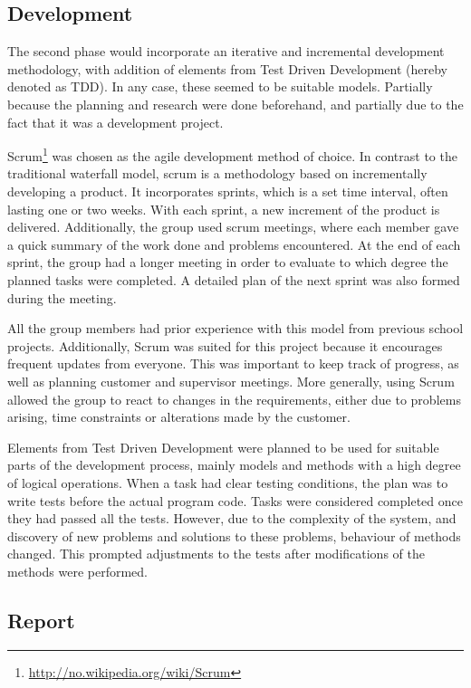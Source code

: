 \subsection{Development}
\label{subsec:process_and_methodology-process_methodology-development}

The second phase would incorporate an iterative and incremental development methodology, with addition of elements from Test Driven Development (hereby denoted as TDD). In any case, these seemed to be suitable models. Partially because the planning and research were done beforehand, and partially due to the fact that it was a development project.

Scrum\footnote{\url{http://no.wikipedia.org/wiki/Scrum}} was chosen as the agile development method of choice. In contrast to the traditional waterfall model, scrum is a methodology based on incrementally developing a product. It incorporates sprints, which is a set time interval, often lasting one or two weeks. With each sprint, a new increment of the product is delivered. Additionally, the group used scrum meetings, where each member gave a quick summary of the work done and problems encountered. At the end of each sprint, the group had a longer meeting in order to evaluate to which degree the planned tasks were completed. A detailed plan of the next sprint was also formed during the meeting.

All the group members had prior experience with this model from previous school projects. Additionally, Scrum was suited for this project because it encourages frequent updates from everyone. This was important to keep track of progress, as well as planning customer and supervisor meetings. More generally, using Scrum allowed the group to react to changes in the requirements, either due to problems arising, time constraints or alterations made by the customer.

Elements from Test Driven Development were planned to be used for suitable parts of the development process, mainly models and methods with a high degree of logical operations. When a task had clear testing conditions, the plan was to write tests before the actual program code. Tasks were considered completed once they had passed all the tests. However, due to the complexity of the system, and discovery of new problems and solutions to these problems, behaviour of methods changed. This prompted adjustments to the tests after modifications of the methods were performed.

\subsection{Report}
\label{subsec:process_and_methodology-process_methodology-report}

